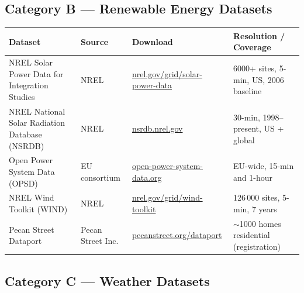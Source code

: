 \documentclass[11pt,a4paper]{article}
\begin{document}
\subsection{Category B --- Renewable Energy Datasets}

\begin{longtable}{p{3.6cm}p{2.6cm}p{4.6cm}p{3.4cm}}
\toprule
\textbf{Dataset} & \textbf{Source} & \textbf{Download} & \textbf{Resolution / Coverage} \\
\midrule
\endhead

NREL Solar Power Data for Integration Studies & NREL &
\href{https://www.nrel.gov/grid/solar-power-data.html}{nrel.gov/grid/solar-power-data} &
6000+ sites, 5-min, US, 2006 baseline \\

NREL National Solar Radiation Database (NSRDB) & NREL &
\href{https://nsrdb.nrel.gov/}{nsrdb.nrel.gov} &
30-min, 1998--present, US + global \\

Open Power System Data (OPSD) & EU consortium &
\href{https://open-power-system-data.org/}{open-power-system-data.org} &
EU-wide, 15-min and 1-hour \\

NREL Wind Toolkit (WIND) & NREL &
\href{https://www.nrel.gov/grid/wind-toolkit.html}{nrel.gov/grid/wind-toolkit} &
126\,000 sites, 5-min, 7 years \\

Pecan Street Dataport & Pecan Street Inc. &
\href{https://www.pecanstreet.org/dataport/}{pecanstreet.org/dataport} &
$\sim$1000 homes residential (registration) \\
\bottomrule
\end{longtable}

\subsection{Category C --- Weather Datasets}
\end{document}
